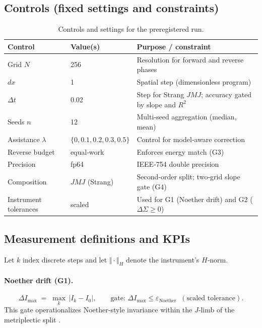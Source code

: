 \documentclass{article}
\begin{document}
\subsection*{Controls (fixed settings and constraints)}
\begin{table}[t]
  \centering
  \caption{Controls and settings for the preregistered run.}
  \label{tab:controls}
  \begin{tabular}{@{}lll@{}}
  \toprule
  Control & Value(s) & Purpose / constraint \\
  \midrule
  Grid $N$ & 256 & Resolution for forward and reverse phases \\
  $dx$ & 1 & Spatial step (dimensionless program) \\
  $\Delta t$ & 0.02 & Step for Strang $J\!M\!J$; accuracy gated by slope and $R^2$ \\
  Seeds $n$ & 12 & Multi‑seed aggregation (median, mean) \\
  Assistance $\lambda$ & $\{0,0.1,0.2,0.3,0.5\}$ & Control for model‑aware correction \\
  Reverse budget & equal‑work & Enforces energy match (G3) \\
  Precision & fp64 & IEEE‑754 double precision \\
  Composition & $J\!M\!J$ (Strang) & Second‑order split; two‑grid slope gate (G4) \\
  Instrument tolerances & scaled & Used for G1 (Noether drift) and G2 ($\Delta\Sigma\ge 0$) \\
  \bottomrule
  \end{tabular}
\end{table}

\subsection*{Measurement definitions and KPIs}
Let $k$ index discrete steps and let $\Vert\cdot\Vert_H$ denote the instrument’s $H$‑norm.

\paragraph{Noether drift (G1).}
\begin{equation}
  \Delta I_{\max} \;=\; \max_k \,\bigl| I_k - I_0 \bigr|, \qquad \text{gate: } \Delta I_{\max} \le \varepsilon_{\text{Noether}} \;\;(\text{scaled tolerance}).
\end{equation}
This gate operationalizes Noether‑style invariance within the $J$‑limb of the metriplectic split \citep{Morrison1986,VDMCanonEquations2025}.
\end{document}
